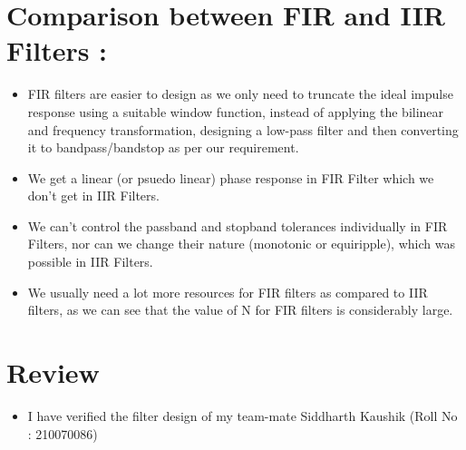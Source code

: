 \documentclass{article}
\begin{document}
\section{Comparison between FIR and IIR Filters :}
\begin{itemize}
    \item FIR filters are easier to design as we only need to truncate the ideal impulse response using a suitable window function, instead of applying the bilinear and frequency transformation, designing a low-pass filter and then converting it to bandpass/bandstop as per our requirement.
    \item We get a linear (or psuedo linear) phase response in FIR Filter which we don't get in IIR Filters.
    \item We can't control the passband and stopband tolerances individually in FIR Filters, nor can we change their nature (monotonic or equiripple), which was possible in IIR Filters.
    \item We usually need a lot more resources for FIR filters as compared to IIR
    filters, as we can see that the value of N for FIR filters is considerably
    large.
\end{itemize}
\section{Review}

\begin{itemize}
    \item I have verified the filter design of my team-mate Siddharth Kaushik (Roll No : 210070086) 
\end{itemize}
\end{document}
